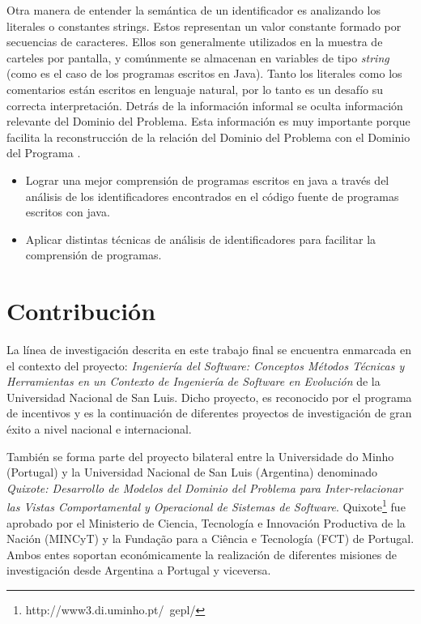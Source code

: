 \documentclass[12pt]{report}
\begin{document}
Otra manera de entender la semántica de un identificador es analizando los 
literales o constantes strings.
Estos representan un valor constante formado por  secuencias de caracteres. 
Ellos son generalmente utilizados en la muestra de carteles por pantalla, y 
comúnmente se almacenan en variables de tipo \textit{string} (como es el caso de 
los programas escritos en Java).
Tanto los literales como los comentarios están escritos en lenguaje natural, por lo tanto es un desafío su correcta interpretación.
Detrás de la información informal se oculta información relevante del 
Dominio del Problema.
Esta información es muy importante porque facilita  la reconstrucción de la relación del  
Dominio del Problema con el Dominio del Programa 
\cite{LF94,embley2004tsu}.%


\begin{itemize}
\item Lograr una mejor comprensión de programas escritos en java a través del análisis de los identificadores encontrados en el código fuente de programas escritos con java.
\end{itemize}

\begin{itemize}
\item Aplicar distintas técnicas de análisis de identificadores para facilitar la comprensión de programas.
\end{itemize}


\pagebreak %
\section{Contribución}
La línea de investigación descrita en este trabajo final se encuentra enmarcada en el 
contexto del proyecto: \textit{Ingeniería del Software: Conceptos Métodos Técnicas y 
Herramientas en un Contexto de Ingeniería de Software en Evolución} de la Universidad 
Nacional de San Luis. 
Dicho proyecto, es reconocido por el programa de incentivos y es la continuación de 
diferentes proyectos de investigación de gran éxito a nivel nacional e internacional.

También se forma parte del proyecto bilateral entre la Universidade do Minho (Portugal)
 y la Universidad Nacional de San Luis (Argentina) denominado \textit{Quixote: Desarrollo de 
Modelos del Dominio del Problema para Inter-relacionar las Vistas Comportamental y 
Operacional de Sistemas de Software}. Quixote\footnote[1]{http://www3.di.uminho.pt/~gepl/} fue aprobado por el 
Ministerio de Ciencia, Tecnología e Innovación Productiva de la Nación 
(MINCyT) y la Fundação para a Ciência e Tecnología (FCT) de Portugal. 
Ambos entes soportan económicamente la realización de diferentes misiones de investigación desde Argentina a Portugal y viceversa.
\end{document}
